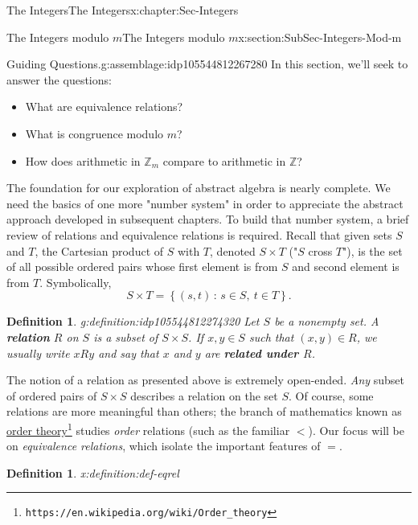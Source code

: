 \documentclass[oneside,10pt,]{book}
\newcommand{\terminology}[1]{\textbf{#1}}
\numberwithin{equation}{section}
\newcommand{\setof}[2]{{\left\{#1\,\colon\,#2\right\}}}
\def\Z{{\mathbb Z}}
\newtheorem{definition}[theorem]{Definition}
\newcommand{\lt}{<}
\begin{document}
\begin{chapterptx}{The Integers}{}{The Integers}{}{}{x:chapter:Sec-Integers}
%
\begin{sectionptx}{The Integers modulo \(m\)}{}{The Integers modulo \(m\)}{}{}{x:section:SubSec-Integers-Mod-m}
\begin{assemblage}{Guiding Questions.}{g:assemblage:idp105544812267280}%
In this section, we'll seek to answer the questions: %
\begin{itemize}[label=\textbullet]
\item{}What are equivalence relations?%
\item{}What is congruence modulo \(m\)?%
\item{}How does arithmetic in \(\Z_m\) compare to arithmetic in \(\Z\)?%
\end{itemize}
%
\end{assemblage}
The foundation for our exploration of abstract algebra is nearly complete. We need the basics of one more "number system" in order to appreciate the abstract approach developed in subsequent chapters. To build that number system, a brief review of relations and equivalence relations is required. Recall that given sets \(S\) and \(T\), the Cartesian product of \(S\) with \(T\), denoted \(S\times T\) ("\(S\) cross \(T\)"), is the set of all possible ordered pairs whose first element is from \(S\) and second element is from \(T\). Symbolically,%
%
\begin{equation*}
S\times T = \setof{(s,t)}{s\in S, \ t\in T}.
\end{equation*}
\begin{definition}{}{g:definition:idp105544812274320}%
%
Let \(S\) be a nonempty set. A \terminology{relation} \(R\) on \(S\) is a subset of \(S\times S\). If \(x,y\in S\) such that \((x,y)\in R\), we usually write \(xRy\) and say that \(x\) and \(y\) are \terminology{related under \(R\)}.%
\end{definition}
The notion of a relation as presented above is extremely open-ended. \emph{Any} subset of ordered pairs of \(S\times S\) describes a relation on the set \(S\). Of course, some relations are more meaningful than others; the branch of mathematics known as \href{https://en.wikipedia.org/wiki/Order_theory}{order theory}\footnote{\nolinkurl{https://en.wikipedia.org/wiki/Order_theory}\label{g:fn:idp105544812281360}} studies \emph{order} relations (such as the familiar \(\lt\)). Our focus will be on \emph{equivalence relations}, which isolate the important features of \(=\).%
\begin{definition}{}{x:definition:def-eqrel}%
%
%

\end{definition}
\end{sectionptx}
\end{chapterptx}
\end{document}
